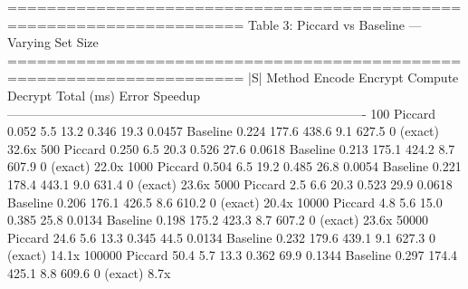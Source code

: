 ======================================================================
  Table 3: Piccard vs Baseline — Varying Set Size
======================================================================
     |S|    Method  Encode  Encrypt  Compute  Decrypt  Total (ms)      Error  Speedup
-------------------------------------------------------------------------------------
     100   Piccard   0.052      5.5     13.2    0.346        19.3     0.0457         
          Baseline   0.224    177.6    438.6      9.1       627.5  0 (exact)    32.6x
     500   Piccard   0.250      6.5     20.3    0.526        27.6     0.0618         
          Baseline   0.213    175.1    424.2      8.7       607.9  0 (exact)    22.0x
    1000   Piccard   0.504      6.5     19.2    0.485        26.8     0.0054         
          Baseline   0.221    178.4    443.1      9.0       631.4  0 (exact)    23.6x
    5000   Piccard     2.5      6.6     20.3    0.523        29.9     0.0618         
          Baseline   0.206    176.1    426.5      8.6       610.2  0 (exact)    20.4x
   10000   Piccard     4.8      5.6     15.0    0.385        25.8     0.0134         
          Baseline   0.198    175.2    423.3      8.7       607.2  0 (exact)    23.6x
   50000   Piccard    24.6      5.6     13.3    0.345        44.5     0.0134         
          Baseline   0.232    179.6    439.1      9.1       627.3  0 (exact)    14.1x
  100000   Piccard    50.4      5.7     13.3    0.362        69.9     0.1344         
          Baseline   0.297    174.4    425.1      8.8       609.6  0 (exact)     8.7x

